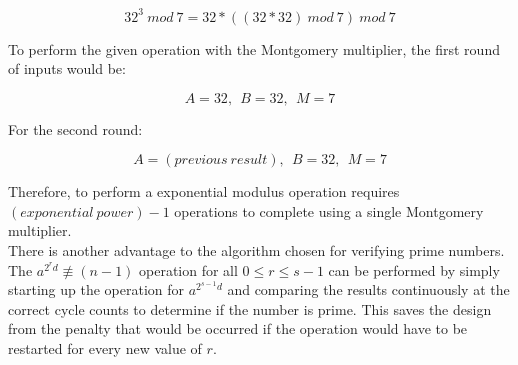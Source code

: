 \documentclass[journal]{IEEEtran}
\begin{document}
\begin{displaymath}
	32^3\ mod\ 7 = 32*((32*32)\ mod\ 7)\ mod\ 7
\end{displaymath}

To perform the given operation with the Montgomery multiplier, the first round of inputs would be:

\begin{displaymath}
	A = 32,\ \ B = 32,\ \ M = 7
\end{displaymath}

For the second round:

\begin{displaymath}
	A = (previous\ result),\ \ B=32,\ \ M=7
\end{displaymath}

Therefore, to perform a exponential modulus operation requires $(exponential\ power) - 1$ operations to complete using a single Montgomery multiplier. \\

There is another advantage to the algorithm chosen for verifying prime numbers.
The $a^{2^rd} \not \equiv (n-1)$ operation for all $0 \le r \le s-1$ can be performed by simply starting up the operation for $a^{2^{s-1}d}$ and comparing the results continuously at the correct cycle counts to determine if the number is prime. This saves the design from the penalty that would be occurred if the operation would have to be restarted for every new value of $r$. 





%
%
\end{document}

